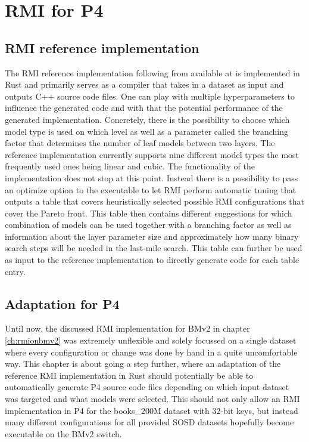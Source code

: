 
\chapter{RMI for P4}
\label{ch:rmiforp4}

\section{RMI reference implementation}
The RMI reference implementation following from \cite{cdfshop} available at \cite{rmi-reference} is implemented in Rust and primarily serves as a compiler that takes in a dataset as input and outputs C++ source code files. One can play with multiple hyperparameters to influence the generated code and with that the potential performance of the generated implementation. Concretely, there is the possibility to choose which model type is used on which level as well as a parameter called the branching factor that determines the number of leaf models between two layers. The reference implementation currently supports nine different model types the most frequently used ones being linear and cubic. The functionality of the implementation does not stop at this point. Instead there is a possibility to pass an optimize option to the executable to let RMI perform automatic tuning that outputs a table that covers heuristically selected possible RMI configurations that cover the Pareto front. This table then contains different suggestions for which combination of models can be used together with a branching factor as well as information about the layer parameter size and approximately how many binary search steps will be needed in the last-mile search. This table can further be used as input to the reference implementation to directly generate code for each table entry.

\section{Adaptation for P4}
Until now, the discussed RMI implementation for BMv2 in chapter \ref{ch:rmionbmv2} was extremely unflexible and solely focussed on a single dataset where every configuration or change was done by hand in a quite uncomfortable way. This chapter is about going a step further, where an adaptation of the reference RMI implementation in Rust should potentially be able to automatically generate P4 source code files depending on which input dataset was targeted and what models were selected. This should not only allow an RMI implementation in P4 for the books\_200M dataset with 32-bit keys, but instead many different configurations for all provided SOSD datasets hopefully become executable on the BMv2 switch.\\

